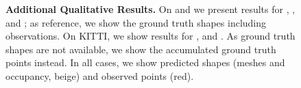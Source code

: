 \begin{figure}
\begin{subfigure}[t]{0.1\textwidth}
    \end{subfigure}
    \caption{{\bf Additional Qualitative Results.} On \clean and \noisy we present results for \ML, \cite{Engelmann2016GCPR}, \AML and \Sup; as reference, we show the ground truth shapes including observations. On KITTI, we show results for \cite{Engelmann2016GCPR}, \AML and \Sup. As ground truth shapes are not available, we show the accumulated ground truth points instead. In all cases, we show predicted shapes (meshes and occupancy, {\color{rbeige}beige}) and observed points ({\color{rred}red}).}
    \label{fig:appendix-experiments-shapenet-kitti}
\end{figure}
